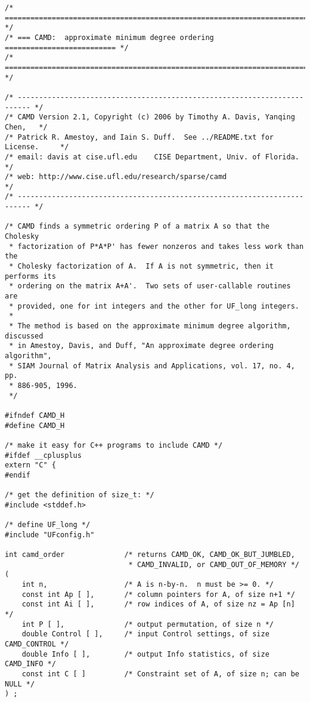 \documentclass[11pt]{article}
\begin{document}
{\footnotesize
\begin{verbatim}
/* ========================================================================= */
/* === CAMD:  approximate minimum degree ordering ========================== */
/* ========================================================================= */

/* ------------------------------------------------------------------------- */
/* CAMD Version 2.1, Copyright (c) 2006 by Timothy A. Davis, Yanqing Chen,   */
/* Patrick R. Amestoy, and Iain S. Duff.  See ../README.txt for License.     */
/* email: davis at cise.ufl.edu    CISE Department, Univ. of Florida.        */
/* web: http://www.cise.ufl.edu/research/sparse/camd                         */
/* ------------------------------------------------------------------------- */

/* CAMD finds a symmetric ordering P of a matrix A so that the Cholesky
 * factorization of P*A*P' has fewer nonzeros and takes less work than the
 * Cholesky factorization of A.  If A is not symmetric, then it performs its
 * ordering on the matrix A+A'.  Two sets of user-callable routines are
 * provided, one for int integers and the other for UF_long integers.
 *
 * The method is based on the approximate minimum degree algorithm, discussed
 * in Amestoy, Davis, and Duff, "An approximate degree ordering algorithm",
 * SIAM Journal of Matrix Analysis and Applications, vol. 17, no. 4, pp.
 * 886-905, 1996.
 */

#ifndef CAMD_H
#define CAMD_H

/* make it easy for C++ programs to include CAMD */
#ifdef __cplusplus
extern "C" {
#endif

/* get the definition of size_t: */
#include <stddef.h>

/* define UF_long */
#include "UFconfig.h"

int camd_order              /* returns CAMD_OK, CAMD_OK_BUT_JUMBLED,
                             * CAMD_INVALID, or CAMD_OUT_OF_MEMORY */
(
    int n,                  /* A is n-by-n.  n must be >= 0. */
    const int Ap [ ],       /* column pointers for A, of size n+1 */
    const int Ai [ ],       /* row indices of A, of size nz = Ap [n] */
    int P [ ],              /* output permutation, of size n */
    double Control [ ],     /* input Control settings, of size CAMD_CONTROL */
    double Info [ ],        /* output Info statistics, of size CAMD_INFO */
    const int C [ ]         /* Constraint set of A, of size n; can be NULL */
) ;


\end{verbatim}}
\end{document}
